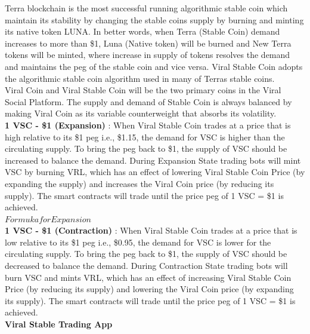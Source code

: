 \documentclass[10pt]{article}
\begin{document}
Terra blockchain is the most successful running algorithmic stable coin which maintain its stability by changing the stable coin\textsc{}s supply by burning and minting it\textsc{}s native token LUNA. In better words, when Terra (Stable Coin) demand increases to more than \$1, Luna (Native token) will be burned and New Terra tokens will be minted, where increase in supply of tokens resolves the demand and maintains the peg of the stable coin and vice versa. Viral Stable Coin adopts the algorithmic stable coin algorithm used in many of Terra\textsc{}s stable coins.\\

Viral Coin and Viral Stable Coin will be the two primary coins in the Viral Social Platform. The supply and demand of Stable Coin is always balanced by making Viral Coin as it\textsc{}s variable counterweight that absorbs it\textsc{}s volatility.\\

\textbf{1 VSC - \$1 (Expansion)} : When Viral Stable Coin trades at a price that is high relative to it\textsc{}s \$1 peg i.e., \$1.15, the demand for VSC is higher than the circulating supply. To bring the peg back to \$1, the supply of VSC should be increased to balance the demand. During Expansion State trading bots will mint VSC by burning VRL, which has an effect of lowering Viral Stable Coin Price (by expanding the supply) and increases the Viral Coin price (by reducing it\textsc{}s supply). The smart contracts will trade until the price peg of 1 VSC = \$1 is achieved.\\

$Formuka for Expansion$\\

\textbf{1 VSC - \$1 (Contraction)} : When Viral Stable Coin trades at a price that is low relative to it\textsc{}s \$1 peg i.e., \$0.95, the demand for VSC is lower for the circulating supply. To bring the peg back to \$1, the supply of VSC should be decreased to balance the demand. During Contraction State trading bots will burn VSC and mints VRL, which has an effect of increasing Viral Stable Coin Price (by reducing it\textsc{}s supply) and lowering the Viral Coin price (by expanding it\textsc{}s supply). The smart contracts will trade until the price peg of 1 VSC = \$1 is achieved.\\

\textbf{Viral Stable Trading App}\\
\end{document}
